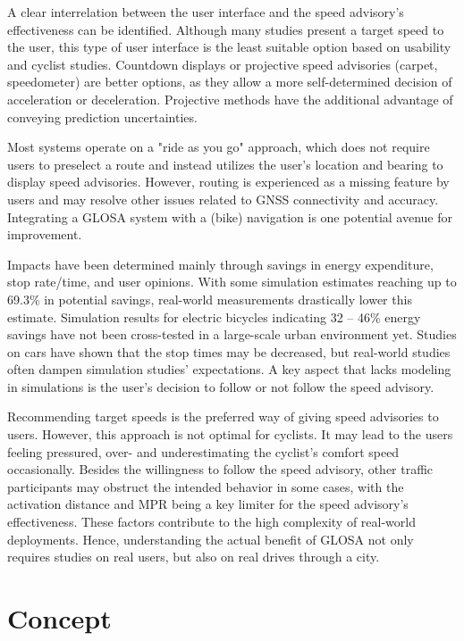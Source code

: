 \begin{Summary}
A clear interrelation between the user interface and the speed advisory's effectiveness can be identified. Although many studies present a target speed to the user, this type of user interface is the least suitable option based on usability and cyclist studies. Countdown displays or projective speed advisories (carpet, speedometer) are better options, as they allow a more self-determined decision of acceleration or deceleration. Projective methods have the additional advantage of conveying prediction uncertainties. 

Most systems operate on a "ride as you go" approach, which does not require users to preselect a route and instead utilizes the user's location and bearing to display speed advisories. However, routing is experienced as a missing feature by users and may resolve other issues related to GNSS connectivity and accuracy. Integrating a GLOSA system with a (bike) navigation is one potential avenue for improvement.

Impacts have been determined mainly through savings in energy expenditure, stop rate/time, and user opinions. With some simulation estimates reaching up to 69.3\% in potential savings, real-world measurements drastically lower this estimate. Simulation results for electric bicycles indicating 32 -- 46\% energy savings have not been cross-tested in a large-scale urban environment yet. Studies on cars have shown that the stop times may be decreased, but real-world studies often dampen simulation studies' expectations. A key aspect that lacks modeling in simulations is the user's decision to follow or not follow the speed advisory.

Recommending target speeds is the preferred way of giving speed advisories to users. However, this approach is not optimal for cyclists. It may lead to the users feeling pressured, over- and underestimating the cyclist's comfort speed occasionally. Besides the willingness to follow the speed advisory, other traffic participants may obstruct the intended behavior in some cases, with the activation distance and MPR being a key limiter for the speed advisory's effectiveness. These factors contribute to the high complexity of real-world deployments. Hence, understanding the actual benefit of GLOSA not only requires studies on real users, but also on real drives through a city.
\end{Summary}

\section{Concept}

